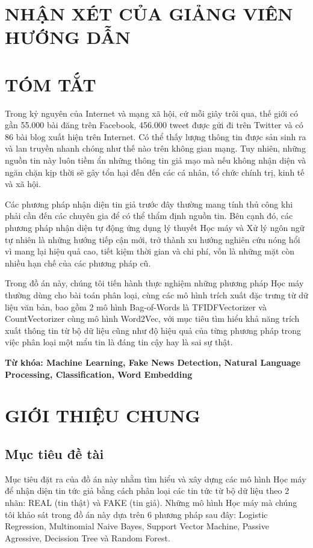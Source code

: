 \documentclass[12pt,a4paper,oneside]{book}
\begin{document}
\chapter*{NHẬN XÉT CỦA GIẢNG VIÊN HƯỚNG DẪN}
	
\chapter*{TÓM TẮT}

	Trong kỷ nguyên của Internet và mạng xã hội, cứ mỗi giây trôi qua, thế giới có gần 55.000 bài đăng trên Facebook, 456.000 tweet được gửi đi trên Twitter và có 86 bài blog xuất hiện trên Internet. Có thể thấy lượng thông tin được sản sinh ra và lan truyền nhanh chóng như thế nào trên không gian mạng. Tuy nhiên, những nguồn tin này luôn tiềm ẩn những thông tin giả mạo mà nếu không nhận diện và ngăn chặn kịp thời sẽ gây tổn hại đến đến các cá nhân, tổ chức chính trị, kinh tế và xã hội. 


	Các phương pháp nhận diện tin giả trước đây thường mang tính thủ công khi phải cần đến các chuyên gia để có thể thẩm định nguồn tin. Bên cạnh đó, các phương pháp nhận diện tự động ứng dụng lý thuyết Học máy và Xử lý ngôn ngữ tự nhiên là những hướng tiếp cận mới, trở thành xu hướng nghiên cứu nóng hổi vì mang lại hiệu quả cao, tiết kiệm thời gian và chi phí, vốn là những mặt còn nhiều hạn chế của các phương pháp cũ.


	Trong đồ án này, chúng tôi tiến hành thực nghiệm những phương pháp Học máy thường dùng cho bài toán phân loại, cùng các mô hình trích xuất đặc trưng từ dữ liệu văn bản, bao gồm 2 mô hình Bag-of-Words là TFIDFVectorizer và CountVectorizer cùng mô hình Word2Vec, với mục tiêu tìm hiểu khả năng trích xuất thông tin từ bộ dữ liệu cũng như độ hiệu quả của từng phương pháp trong việc phân loại một mẩu tin là đáng tin cậy hay là sai sự thật.

	\vspace{0.5cm}
	\textbf{Từ khóa: Machine Learning, Fake News Detection, Natural Language Processing, Classification, Word Embedding}
	\pagebreak
	
\chapter{GIỚI THIỆU CHUNG}

	\section{Mục tiêu đề tài}
	Mục tiêu đặt ra của đồ án này nhằm tìm hiểu và xây dựng các mô hình Học máy để nhận diện tin tức giả bằng cách phân loại các tin tức từ bộ dữ liệu theo 2 nhãn: REAL (tin thật) và FAKE (tin giả). Những mô hình Học máy mà chúng tôi khảo sát trong đồ án này dựa trên 6 phương pháp sau đây: Logistic Regression, Multinomial Naive Bayes, Support Vector Machine, Passive Agressive, Decission Tree và Random Forest.
	
\end{document}
